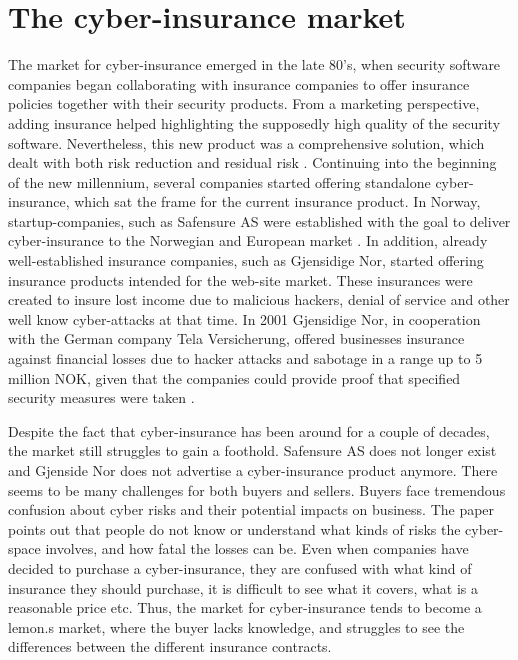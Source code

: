 \section{The cyber-insurance market}
The market for cyber-insurance emerged in the late 80's, when security software companies began collaborating with insurance companies to offer insurance policies together with their security products. From a marketing perspective, adding insurance helped highlighting the supposedly high quality of the security software. Nevertheless, this new product was a comprehensive solution, which dealt with both risk reduction and residual risk \cite{bolot2008new}. Continuing into the beginning of the new millennium, several companies started offering standalone cyber-insurance, which sat the frame for the current insurance product. In Norway, startup-companies, such as Safensure AS were established with the goal to deliver cyber-insurance to the Norwegian and European market \cite{digi}. In addition, already well-established insurance companies, such as Gjensidige Nor, started offering insurance products intended for the web-site market. These insurances were created to insure lost income due to malicious hackers, denial of service and other well know cyber-attacks at that time. In 2001 Gjensidige Nor, in cooperation with the German company Tela Versicherung, offered businesses insurance against financial losses due to hacker attacks and sabotage in a range up to 5 million NOK, given that the companies could provide proof that specified security measures were taken \cite{dagensithackerforsikring}. 
 

Despite the fact that cyber-insurance has been around for a couple of decades, the market still struggles to gain a foothold. Safensure AS does not longer exist and Gjenside Nor does not advertise a cyber-insurance product anymore. There seems to be many challenges for both buyers and sellers. Buyers face tremendous confusion about cyber risks and their potential impacts on business. 
The paper \cite{Cyberworkshop} points out that people do not know or understand what kinds of risks the cyber-space involves, and how fatal the losses can be. Even when companies have decided to purchase a cyber-insurance, they are confused with what kind of insurance they should purchase, it is difficult to see what it covers, what is a reasonable price etc. Thus, the market for cyber-insurance tends to become a lemon.s market, where the buyer lacks knowledge, and struggles to see the differences between the different insurance contracts.


